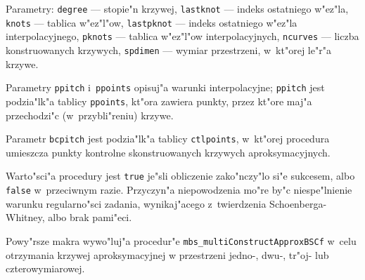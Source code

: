 Parametry: \texttt{degree} --- stopie"n krzywej, \texttt{lastknot} ---
indeks ostatniego w"ez"la, \texttt{knots} --- tablica w"ez"l"ow,
\texttt{lastpknot} --- indeks ostatniego w"ez"la interpolacyjnego,
\texttt{pknots} --- tablica w"ez"l"ow interpolacyjnych, \texttt{ncurves} ---
liczba konstruowanych krzywych, \texttt{spdimen} --- wymiar przestrzeni,
w~kt"orej le"r"a krzywe.

\begin{sloppypar}
Parametry \texttt{ppitch} i~\texttt{ppoints} opisuj"a warunki
interpolacyjne; \texttt{ppitch} jest podzia"lk"a tablicy \texttt{ppoints},
kt"ora zawiera punkty, przez kt"ore maj"a przechodzi"c (w~przybli"reniu)
krzywe.
\end{sloppypar}

Parametr \texttt{bcpitch} jest podzia"lk"a tablicy \texttt{ctlpoints},
w~kt"orej procedura umieszcza punkty kontrolne skonstruowanych krzywych
aproksymacyjnych.

Warto"sci"a procedury jest \texttt{true} je"sli obliczenie zako"nczy"lo si"e
sukcesem, albo \texttt{false} w~przeciwnym razie. Przyczyn"a niepowodzenia
mo"re by"c niespe"lnienie warunku regularno"sci zadania, wynikaj"acego
z~twierdzenia Schoenberga-Whitney, albo brak pami"eci.

\vspace{\bigskipamount}
Powy"rsze makra wywo"luj"a procedur"e
\texttt{mbs\_multiConstructApproxBSCf} w~celu otrzymania krzywej
aproksymacyjnej w przestrzeni jedno-, dwu-, tr"oj- lub czterowymiarowej.


